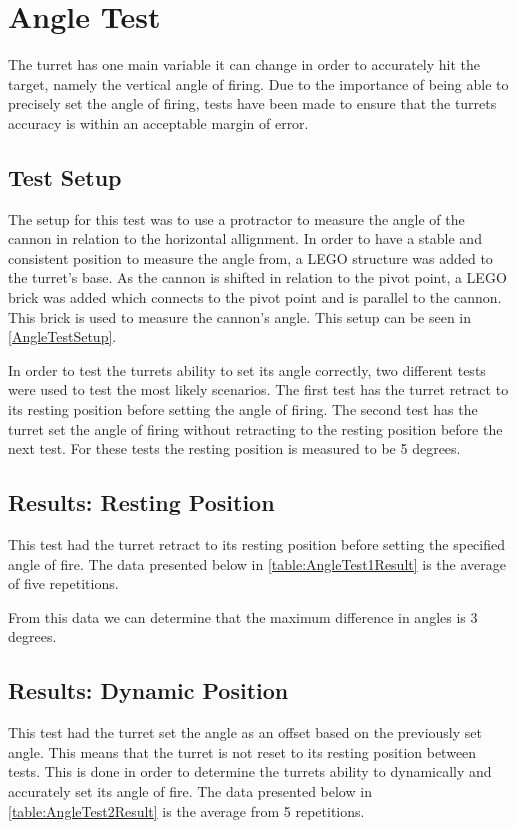 \chapter{Angle Test}\label{angleTest}
The turret has one main variable it can change in order to accurately hit the
target, namely the vertical angle of firing. Due to the importance of being able
to precisely set the angle of firing, tests have been made to ensure that the
turrets accuracy is within an acceptable margin of error.

\section{Test Setup}
The setup for this test was to use a protractor to measure the angle of the
cannon in relation to the horizontal allignment. In order to have a stable and
consistent position to measure the angle from, a LEGO structure was added to the
turret's base. As the cannon is shifted in relation to the pivot point, a LEGO
brick was added which connects to the pivot point and is parallel to the cannon.
This brick is used to measure the cannon's angle. This setup can be seen in
\autoref{AngleTestSetup}.


In order to test the turrets ability to set its angle correctly, two different
tests were used to test the most likely scenarios. The first test has the turret
retract to its resting position before setting the angle of firing. The second
test has the turret set the angle of firing without retracting to the resting
position before the next test. For these tests the resting position is measured
to be 5 degrees.

\section{Results: Resting Position}
This test had the turret retract to its resting position before setting the
specified angle of fire. The data presented below in
\autoref{table:AngleTest1Result} is the average of five repetitions.


From this data we can determine that the maximum difference in angles is 3
degrees.  

\section{Results: Dynamic Position}
This test had the turret set the angle as an offset based on the previously set
angle. This means that the turret is not reset to its resting position between
tests. This is done in order to determine the turrets ability to dynamically and
accurately set its angle of fire. The data presented below in
\autoref{table:AngleTest2Result} is the average from 5 repetitions.

